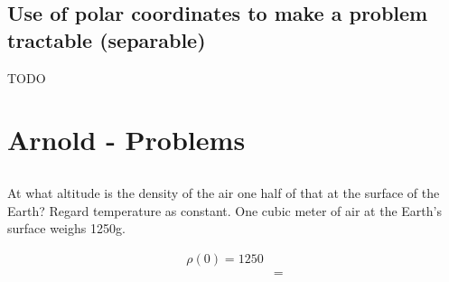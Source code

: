 \subsection{Use of polar coordinates to make a problem tractable (separable)}
TODO

\section{Arnold - Problems}
\subsection{}
\begin{mdframed}
  At what altitude is the density of the air one half of that at the surface of
  the Earth? Regard temperature as constant. One cubic meter of air at the
  Earth's surface weighs 1250g.
\end{mdframed}
\begin{align*}
  \rho(0) = 1250\\
  &=
\end{align*}